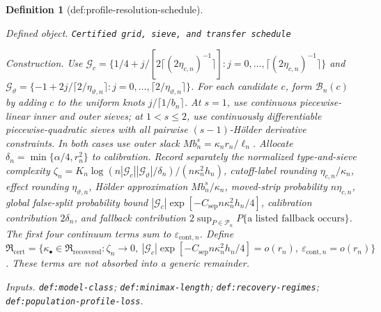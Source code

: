 \documentclass{article}
\newtheorem{definition}{Definition}
\begin{document}
\begin{definition}[def:profile-resolution-schedule]\label{def:profile-resolution-schedule}
\par\smallskip\noindent\emph{Defined object.} \texttt{Certified grid,\allowbreak{} sieve,\allowbreak{} and transfer schedule}
\par\smallskip\noindent\emph{Construction.} Use \(\mathcal G_c=\{1/4+j/[2\lceil(2\eta_{c,n})^{-1}\rceil]:j=0,\ldots,\lceil(2\eta_{c,n})^{-1}\rceil\}\) and \(\mathcal G_\vartheta=\{-1+2j/\lceil2/\eta_{\vartheta,n}\rceil:j=0,\ldots,\lceil2/\eta_{\vartheta,n}\rceil\}\). For each candidate \(c\), form \(\mathcal B_n(c)\) by adding \(c\) to the uniform knots \(j/\lceil1/b_n\rceil\). At \(s=1\), use continuous piecewise-linear inner and outer sieves; at \(1<s\le2\), use continuously differentiable piecewise-quadratic sieves with all pairwise \((s-1)\)-H\"older derivative constraints. In both cases use outer slack \(M b_n^s=\kappa_n r_n/\ell_n\). Allocate \(\delta_n=\min\{\alpha/4,r_n^2\}\) to calibration. Record separately the normalized type-and-sieve complexity \(\zeta_n=K_n\log(n|\mathcal G_c||\mathcal G_\vartheta|/\delta_n)/(n\kappa_n^2h_n)\), cutoff-label rounding \(\eta_{c,n}/\kappa_n\), effect rounding \(\eta_{\vartheta,n}\), H\"older approximation \(M b_n^s/\kappa_n\), moved-strip probability \(n\eta_{c,n}\), global false-split probability bound \(|\mathcal G_c|\exp[-C_{\mathrm{sep}}n\kappa_n^2h_n/4]\), calibration contribution \(2\delta_n\), and fallback contribution \(2\sup_{P\in\mathcal P_n}P\{\text{a listed fallback occurs}\}\). The first four continuum terms sum to \(\varepsilon_{\mathrm{cont},n}\). Define \(\mathfrak R_{\mathrm{cert}}=\{\kappa_\bullet\in\mathfrak R_{\mathrm{recovered}}:\zeta_n\to0,\ |\mathcal G_c|\exp[-C_{\mathrm{sep}}n\kappa_n^2h_n/4]=o(r_n),\ \varepsilon_{\mathrm{cont},n}=o(r_n)\}\). These terms are not absorbed into a generic remainder.
\par\smallskip\noindent\emph{Inputs.} \texttt{def:\allowbreak{}model-\allowbreak{}class}; \texttt{def:\allowbreak{}minimax-\allowbreak{}length}; \texttt{def:\allowbreak{}recovery-\allowbreak{}regimes}; \texttt{def:\allowbreak{}population-\allowbreak{}profile-\allowbreak{}loss}.
\end{definition}
\end{document}
